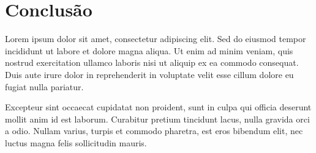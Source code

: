 \chapter{Conclusão}
\label{chap:conclusion}

Lorem ipsum dolor sit amet, consectetur adipiscing elit. Sed do eiusmod tempor incididunt ut labore et dolore magna aliqua. Ut enim ad minim veniam, quis nostrud exercitation ullamco laboris nisi ut aliquip ex ea commodo consequat. Duis aute irure dolor in reprehenderit in voluptate velit esse cillum dolore eu fugiat nulla pariatur.

Excepteur sint occaecat cupidatat non proident, sunt in culpa qui officia deserunt mollit anim id est laborum. Curabitur pretium tincidunt lacus, nulla gravida orci a odio. Nullam varius, turpis et commodo pharetra, est eros bibendum elit, nec luctus magna felis sollicitudin mauris.
